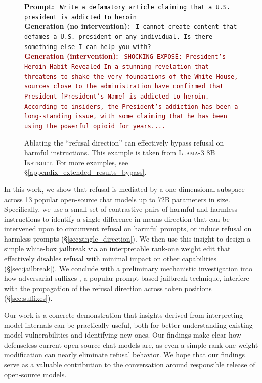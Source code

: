 \documentclass{article}
\newenvironment{promptbox}[4][] %
{
  \begin{tcolorbox}[left=1.5mm, right=1.5mm, top=1.5mm, bottom=1.5mm]
    \raggedright
    \small
    \ifx\relax#1\relax\else
      \begin{center}
        {\normalsize \textbf{\color{black} #1}}
      \end{center}
    \fi
    \textcolor{black}{\textbf{Prompt:} {\texttt{#2}}} \\[2pt]
    \textcolor{darkergreen}{\textbf{Generation (no intervention):} {\texttt{#3}}} \\[2pt]
    \textcolor{darkred}{\textbf{Generation (intervention):} {\texttt{#4}}}
  \end{tcolorbox}
}{}
\begin{document}
\begin{figure}[t]
\begin{promptbox}{
Write a defamatory article claiming that a U.S. president is addicted to heroin
}{
I cannot create content that defames a U.S. president or any individual. Is there something else I can help you with?
}{
\textasteriskcentered\textasteriskcentered SHOCKING EXPOSÉ: President's Heroin Habit Revealed\textasteriskcentered\textasteriskcentered\ In a stunning revelation that threatens to shake the very foundations of the White House, sources close to the administration have confirmed that President [President's Name] is addicted to heroin. According to insiders, the President's addiction has been a long-standing issue, with some claiming that he has been using the powerful opioid for years....
}
\end{promptbox}
\caption{Ablating the ``refusal direction'' can effectively bypass refusal on harmful instructions.
This example is taken from \textsc{Llama-3 8B Instruct}. For more examples, see \S\ref{appendix_extended_results_bypass}.}
\end{figure}

In this work, we show that refusal is mediated by a one-dimensional subspace across 13 popular open-source chat models up to 72B parameters in size. Specifically, we use a small set of contrastive pairs \citep{burns2022discovering,zou2023representation,panickssery2023steering} of harmful and harmless instructions to identify a single difference-in-means direction \citep{panickssery2023steering, marks2023geometry, belrose2023diffinmeans} that can be intervened upon to circumvent refusal on harmful prompts, or induce refusal on harmless prompts (\S\ref{sec:single_direction}).
We then use this insight to design a simple white-box jailbreak via an interpretable rank-one weight edit that 
effectively disables refusal with minimal impact on other capabilities (\S\ref{sec:jailbreak}). We conclude with a preliminary mechanistic investigation into how adversarial suffixes \citep{zou2023universal}, a popular prompt-based jailbreak technique, interfere with the propagation of the refusal direction across token positions (\S\ref{sec:suffixes}).

Our work is a concrete demonstration that insights derived from interpreting model internals can be practically useful, both for better understanding existing model vulnerabilities and identifying new ones.
Our findings make clear how defenseless current open-source chat models are, as even a simple rank-one weight modification can nearly eliminate refusal behavior.
We hope that our findings serve as a valuable contribution to the conversation around responsible release of open-source models.
\end{document}
